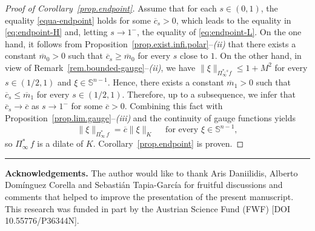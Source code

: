 \documentclass[11pt, reqno]{article}
\theoremstyle{definition}
\numberwithin{equation}{section}
\newtheorem{remark}[theorem]{Remark}
\newcommand{\Sphere}{\mathbb{S}^{n - 1}}
\begin{document}
\begin{proof}[Proof of Corollary~\ref{prop.endpoint}]
\medskip

Assume that for each $s \in (0, 1)$, the equality \eqref{equa-endpoint} holds for some $\overline c_s > 0$, which leads to the equality in \eqref{eq:endpoint-H} and, letting $s \to 1^-$, the equality of \eqref{eq:endpoint-L}.
On the one hand, it follows from Proposition~\ref{prop.exist.infi.polar}--\textit{(ii)} that there exists a constant $\overline m_0 > 0$ such that $\overline c_s \geq \overline m_0$ for every $s$ close to $1$.
 On the other hand, in view of Remark~\ref{rem.bounded-gauge}--\textit{(ii)}, we have $\| \xi \|_{\Pi^{\ast, s}_\infty f} \leq 1 + M^2$ for every $s \in (1/2, 1)$ and $\xi \in \Sphere$.
Hence, there exists a constant $\overline m_1  > 0$ such that $\overline c_s \leq \overline m_1$ for every $s \in (1/2, 1)$.
Therefore, up to a subsequence, we infer that $\overline c_s \to \overline c$ as $s \to 1^-$ for some $\overline c > 0$.
Combining this fact with Proposition~\ref{prop.lim.gauge}--\textit{(iii)} and the continuity of gauge functions yields
\[
	\| \xi \|_{\Pi^\ast_\infty \, f} = \overline c \| \xi \|_K \quad \text{ for every } \xi \in \Sphere,
\]
so $\Pi^\ast_\infty \, f$ is a dilate of $K$.
Corollary~\ref{prop.endpoint} is proven.
\end{proof}


\noindent\rule{5cm}{1pt} \smallskip\newline\noindent\textbf{Acknowledgements.}
The author would like to thank Aris Daniilidis, Alberto Dom\'inguez Corella and Sebasti\'an Tapia-Garc\'ia for fruitful discussions and comments that helped to improve the presentation of the present manuscript.
This research was funded in part by the Austrian Science Fund (FWF) [DOI 10.55776/P36344N].
\end{document}
